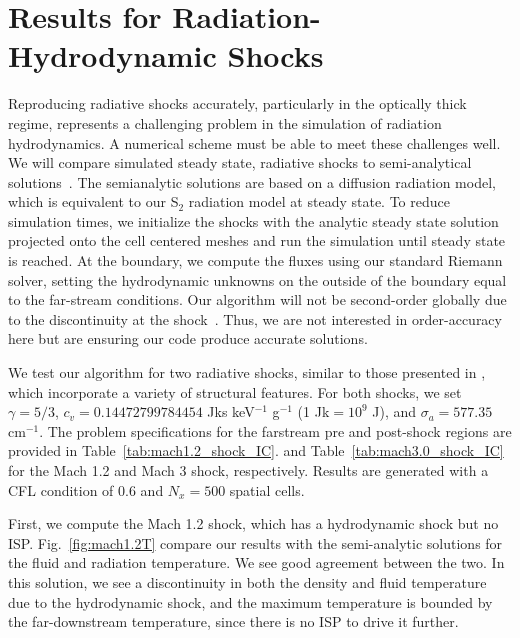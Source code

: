 \documentclass[preprint,12pt]{elsarticle}
\begin{document}
\section{Results for Radiation-Hydrodynamic Shocks}
\label{sec:ShockSolutions}

Reproducing radiative shocks accurately, particularly in the optically thick
regime, represents a challenging problem in the simulation of radiation
hydrodynamics. A numerical scheme must be able to meet these
challenges well.  We will compare simulated steady state, radiative shocks to semi-analytical solutions~\cite{jim???}. The
semianalytic solutions are based on a diffusion radiation model, which is equivalent to our S$_2$ radiation model at steady state.
To reduce simulation times, we initialize the shocks with the analytic steady state solution projected onto the cell centered meshes
and run the simulation until steady state is reached.
At the boundary, we compute the fluxes using our
standard Riemann solver, setting the hydrodynamic unknowns on the outside of the boundary equal to the far-stream conditions.  
Our algorithm will not be second-order globally due to the discontinuity at the shock~\cite{???}.  Thus, we are not interested in
order-accuracy here but are ensuring our code produce accurate solutions.

We test our algorithm for two radiative shocks, similar to those presented in
\cite{lowrie3}, which incorporate a variety of structural features.  For both shocks, we set $\gamma = 5/3$,
$c_v=0.14472799784454$ Jks keV$^{-1}$ g$^{-1}$ (1 Jk$=10^9$ J), and $\sigma_a = 577.35$ cm$^{-1}$. 
The problem specifications for the farstream pre and post-shock regions are provided in Table~\ref{tab:mach1.2_shock_IC}.
and Table~\ref{tab:mach3.0_shock_IC} for the Mach 1.2 and Mach 3 shock, respectively.
Results are generated with a CFL condition of 0.6 and $N_x=500$ spatial cells.

First, we compute the Mach 1.2 shock, which has a hydrodynamic shock but no
ISP.  Fig.~\ref{fig:mach1.2T} compare our
results with the semi-analytic solutions for the fluid and
radiation temperature.  We see good agreement between
the two.  In this solution, we see a discontinuity in both the density and
fluid temperature due to the hydrodynamic shock, and the maximum temperature is
bounded by the far-downstream temperature, since there is no ISP to drive it
further.
\end{document}
